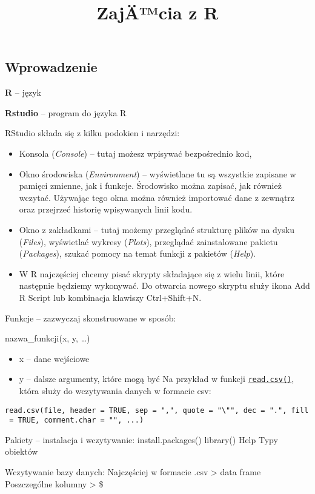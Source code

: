 \documentclass[]{article}
\title{ZajÄ™cia z R}
\author{}
\date{}
\providecommand{\tightlist}{%
  \setlength{\itemsep}{0pt}\setlength{\parskip}{0pt}}
\begin{document}
\maketitle

\subsection{Wprowadzenie}\label{wprowadzenie}

\textbf{R} -- język

\textbf{Rstudio} -- program do języka R

RStudio składa się z kilku podokien i narzędzi:

\begin{itemize}
\item
  Konsola (\emph{Console}) -- tutaj możesz wpisywać bezpośrednio kod,
\item
  Okno środowiska (\emph{Environment}) -- wyświetlane tu są wszystkie
  zapisane w pamięci zmienne, jak i funkcje. Środowisko można zapisać,
  jak również wczytać. Używając tego okna można również importować dane
  z zewnątrz oraz przejrzeć historię wpisywanych linii kodu.
\item
  Okno z zakładkami -- tutaj możemy przeglądać strukturę plików na dysku
  (\emph{Files}), wyświetlać wykresy (\emph{Plots}), przeglądać
  zainstalowane pakietu (\emph{Packages}), szukać pomocy na temat
  funkcji z pakietów (\emph{Help}).
\item
  W R najczęściej chcemy pisać skrypty składające się z wielu linii,
  które następnie będziemy wykonywać. Do otwarcia nowego skryptu służy
  ikona Add R Script lub kombinacja klawiszy Ctrl+Shift+N.
\end{itemize}

Funkcje -- zazwyczaj skonstruowane w sposób:

nazwa\_funkcji(x, y, \ldots{})

\begin{itemize}
\tightlist
\item
  x -- dane wejściowe
\item
  y -- dalsze argumenty, które mogą być Na przykład w funkcji
  \href{https://stat.ethz.ch/R-manual/R-devel/library/utils/html/read.table.html}{\texttt{read.csv()}},
  która służy do wczytywania danych w formacie csv:
\end{itemize}

\texttt{read.csv(file,\ header\ =\ TRUE,\ sep\ =\ ",",\ quote\ =\ "\textbackslash{}"",\ dec\ =\ ".",\ fill\ =\ TRUE,\ comment.char\ =\ "",\ ...)}

Pakiety -- instalacja i wczytywanie: install.packages() library() Help
Typy obiektów

Wczytywanie bazy danych: Najczęściej w formacie .csv \textgreater{} data
frame Poszczególne kolumny \textgreater{} \$
\end{document}

